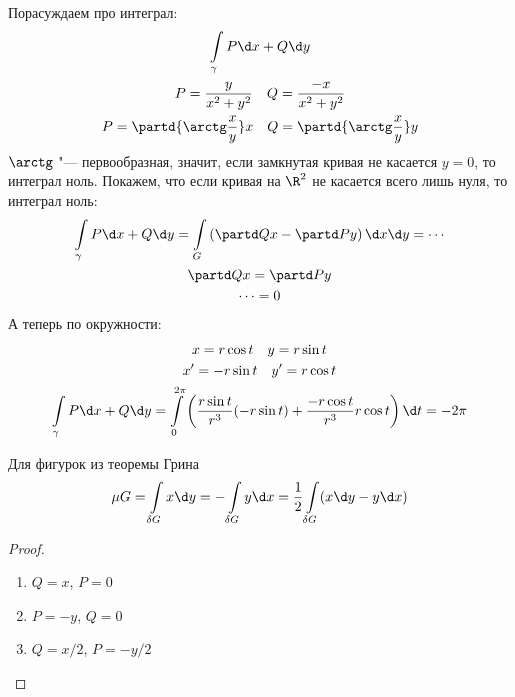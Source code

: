 \begin{exmp}
	Порасуждаем про интеграл:
	\begin{gather*}
		\int\limits_\gamma P \d x + Q \d y \\
		P = \frac{y}{x^2+y^2} \quad Q = \frac{-x}{x^2+y^2} \\
		P = \partd{\arctg \frac{x}y}x \quad Q = \partd{\arctg \frac xy}y
	\end{gather*}
	$\arctg$ "--- первообразная, значит, если замкнутая кривая не касается $y=0$, то интеграл ноль.
	Покажем, что если кривая на $\R^2$ не касается всего лишь нуля, то интеграл ноль:
	\begin{gather*}
		\int\limits_\gamma P \d x + Q \d y
		= \int\limits_G \left(\partd Qx - \partd Py\right) \d x \d y = \cdots \\
		\partd Qx = \partd Py \\
		\cdots = 0 \\
	\end{gather*}
	А теперь по окружности:
	\begin{gather*}
		x = r \cos t \quad y = r \sin t \\
		x' = -r \sin t \quad y' = r \cos t \\
		\int\limits_\gamma P \d x + Q \d y
		= \int\limits_0^{2\pi} \left(\frac{r\sin t}{r^3}(-r\sin t)+\frac{-r\cos t}{r^3}r\cos t\right)\d t=
		-2\pi
	\end{gather*}
\end{exmp}

\begin{conseq}
	Для фигурок из теоремы Грина
	\[ \mu G = \int\limits_{\delta G} x \d y = - \int\limits_{\delta G} y \d x = \frac12 \int\limits_{\delta G} (x \d y - y \d x) \]
\end{conseq}
\begin{proof}
	\begin{enumerate}
		\item $Q = x$, $P = 0$
		\item $P = -y$, $Q = 0$
		\item $Q = x/2$, $P = -y/2$
	\end{enumerate}
\end{proof}
